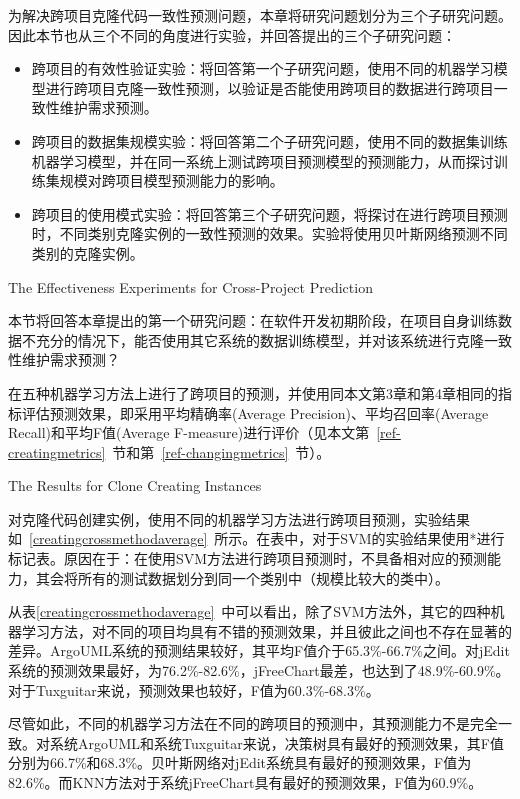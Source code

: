 为解决跨项目克隆代码一致性预测问题，本章将研究问题划分为三个子研究问题。因此本节也从三个不同的角度进行实验，并回答提出的三个子研究问题：
\begin{itemize}
\item
跨项目的有效性验证实验：将回答第一个子研究问题，使用不同的机器学习模型进行跨项目克隆一致性预测，以验证是否能使用跨项目的数据进行跨项目一致性维护需求预测。
\item
跨项目的数据集规模实验：将回答第二个子研究问题，使用不同的数据集训练机器学习模型，并在同一系统上测试跨项目预测模型的预测能力，从而探讨训练集规模对跨项目模型预测能力的影响。
\item
跨项目的使用模式实验：将回答第三个子研究问题，将探讨在进行跨项目预测时，不同类别克隆实例的一致性预测的效果。实验将使用贝叶斯网络预测不同类别的克隆实例。
\end{itemize}

{The Effectiveness Experiments for Cross-Project Prediction}

本节将回答本章提出的第一个研究问题：在软件开发初期阶段，在项目自身训练数据不充分的情况下，能否使用其它系统的数据训练模型，并对该系统进行克隆一致性维护需求预测？

在五种机器学习方法上进行了跨项目的预测，并使用同本文第3章和第4章相同的指标评估预测效果，即采用平均精确率(Average Precision)、平均召回率(Average Recall)和平均F值(Average F-measure)进行评价（见本文第~\ref{ref-creatingmetrics}~节和第~\ref{ref-changingmetrics}~节）。

{The Results for Clone Creating Instances}

对克隆代码创建实例，使用不同的机器学习方法进行跨项目预测，实验结果如~\ref{creatingcrossmethodaverage}~所示。在表中，对于SVM的实验结果使用{*}进行标记表。原因在于：在使用SVM方法进行跨项目预测时，不具备相对应的预测能力，其会将所有的测试数据划分到同一个类别中（规模比较大的类中）。

从表\ref{creatingcrossmethodaverage}~中可以看出，除了SVM方法外，其它的四种机器学习方法，对不同的项目均具有不错的预测效果，并且彼此之间也不存在显著的差异。ArgoUML系统的预测结果较好，其平均F值介于65.3\%-66.7\%之间。对jEdit系统的预测效果最好，为76.2\%-82.6\%，jFreeChart最差，也达到了48.9\%-60.9\%。对于Tuxguitar来说，预测效果也较好，F值为60.3\%-68.3\%。

尽管如此，不同的机器学习方法在不同的跨项目的预测中，其预测能力不是完全一致。对系统ArgoUML和系统Tuxguitar来说，决策树具有最好的预测效果，其F值分别为66.7\%和68.3\%。贝叶斯网络对jEdit系统具有最好的预测效果，F值为82.6\%。而KNN方法对于系统jFreeChart具有最好的预测效果，F值为60.9\%。

